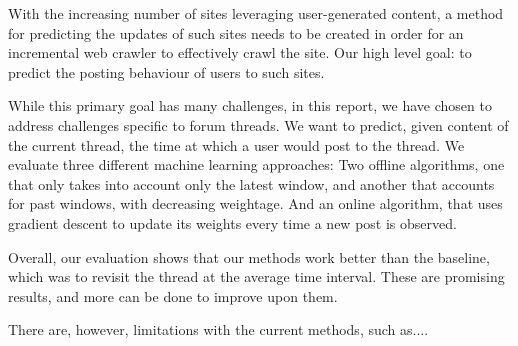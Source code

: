 With the increasing number of sites leveraging user-generated content, a method 
for predicting the updates of such sites needs to be created in order for an 
incremental web crawler to effectively crawl the site. Our high level goal: to 
predict the posting behaviour of users to such sites.

While this primary goal has many challenges, in this report, we have chosen to 
address challenges specific to forum threads. We want to predict, given content 
of the current thread, the time at which a user would post to the thread. We 
evaluate three different machine learning approaches: Two offline algorithms, 
one that only takes into account only the latest window, and another that 
accounts for past windows, with decreasing weightage. And an online algorithm, 
that uses gradient descent to update its weights every time a new post is 
observed.

Overall, our evaluation shows that our methods work better than the baseline, 
which was to revisit the thread at the average time interval. These are 
promising results, and more can be done to improve upon them. 

There are, however, limitations with the current methods, such as....


